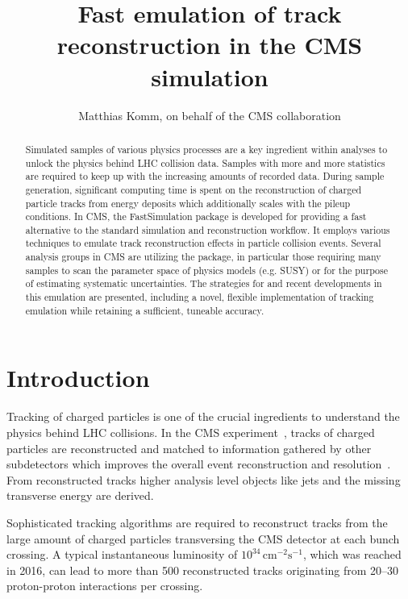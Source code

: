 \documentclass[a4paper]{jpconf}
\begin{document}
\title{Fast emulation of track reconstruction in the CMS simulation}

\author{Matthias Komm, on behalf of the CMS collaboration}

\address{Centre for Cosmology, Particle Physics and Phenomenology,
Universit\'e catholique de Louvain, Louvain-la-Neuve, BELGIUM}


\begin{abstract}
Simulated samples of various physics processes are a key ingredient within analyses to unlock the physics behind LHC collision data. Samples with more and more statistics are required to keep up with the increasing amounts of recorded data. During sample generation, significant computing time is spent on the reconstruction of charged particle tracks from energy deposits which additionally scales with the pileup conditions. In CMS, the FastSimulation package is developed for providing a fast alternative to the standard simulation and reconstruction workflow. It employs various techniques to emulate track reconstruction effects in particle collision events. Several analysis groups in CMS are utilizing the package, in particular those requiring many samples to scan the parameter space of physics models (e.g. SUSY) or for the purpose of estimating systematic uncertainties. The strategies for and recent developments in this emulation are presented, including a novel, flexible implementation of tracking emulation while retaining a sufficient, tuneable accuracy.
\end{abstract}


\section{Introduction}
Tracking of charged particles is one of the crucial ingredients to understand the physics behind LHC collisions. In the CMS experiment~\cite{cms}, tracks of charged particles are reconstructed and matched to information gathered by other subdetectors which improves the overall event reconstruction and resolution~\cite{pf}. From reconstructed tracks higher analysis level objects like jets and the missing transverse energy are derived. 

Sophisticated tracking algorithms are required to reconstruct tracks from the large amount of charged particles transversing the CMS detector at each bunch crossing. A typical instantaneous luminosity of $10^{34}\,\mathrm{cm}^{-2}\mathrm{s}^{-1}$, which was reached in 2016, can lead to more than 500 reconstructed tracks originating from 20--30 proton-proton interactions per crossing.
\end{document}
